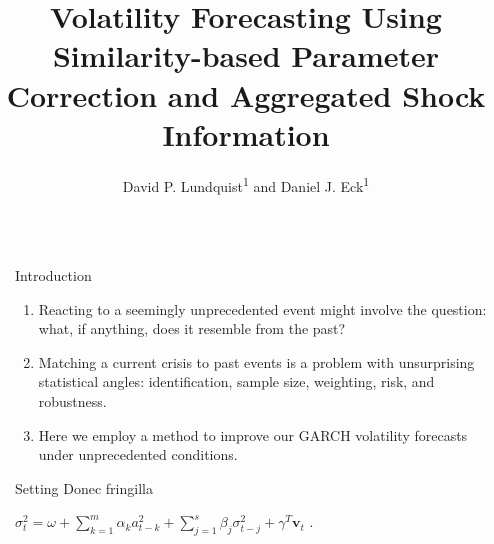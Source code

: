 \documentclass{beamer} %
\title{\LARGE Volatility Forecasting Using Similarity-based Parameter Correction and Aggregated Shock Information} %
\author{David P. Lundquist\textsuperscript{1} and Daniel J. Eck\textsuperscript{1}} %
\institute{\textsuperscript{1}Department of Statistics, University of Illinois Urbana-Champaign} %
\newcommand{\x}{\textbf{v}}
\begin{document}
\begin{frame}[t] %

\begin{columns}[t] %

\begin{column}{0.02\textwidth}\end{column} %

\begin{column}{0.465\textwidth} %


\begin{block}{Introduction}
	\begin{enumerate}
		\item Reacting to a seemingly unprecedented event might involve the question: what, if anything, does it resemble from the past?  
		\item Matching a current crisis to past events is a problem with unsurprising statistical angles: identification, sample size, weighting, risk, and robustness.
		\item Here we employ a method to improve our GARCH volatility forecasts under unprecedented conditions.
	\end{enumerate}
\end{block}

            
\begin{block}{Setting}
	Donec fringilla
	\bigskip %


		$\sigma_{t}^{2} = \omega+ \sum^{m}_{k=1}\alpha_{k}a^{2}_{t-k} + \sum_{j=1}^{s}\beta_{j}\sigma_{t-j}^{2} + \gamma^{T}\x_{t} \text{ .}\label{GARCH-X}$

	\end{block}



\end{column}
\end{columns}
\end{frame}
\end{document}
